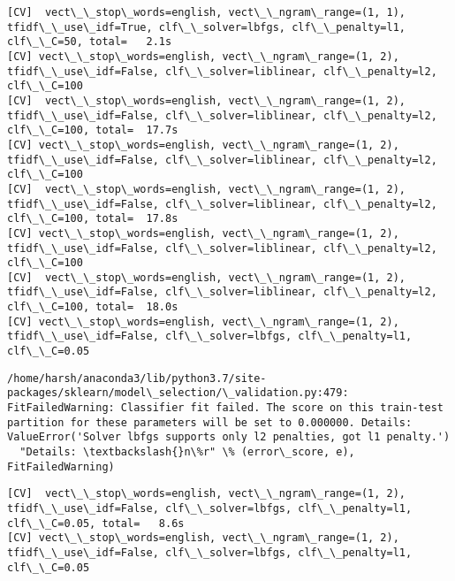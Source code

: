 \documentclass[11pt]{article}
\begin{document}
    \begin{Verbatim}[commandchars=\\\{\}]
[CV]  vect\_\_stop\_words=english, vect\_\_ngram\_range=(1, 1), tfidf\_\_use\_idf=True, clf\_\_solver=lbfgs, clf\_\_penalty=l1, clf\_\_C=50, total=   2.1s
[CV] vect\_\_stop\_words=english, vect\_\_ngram\_range=(1, 2), tfidf\_\_use\_idf=False, clf\_\_solver=liblinear, clf\_\_penalty=l2, clf\_\_C=100 
[CV]  vect\_\_stop\_words=english, vect\_\_ngram\_range=(1, 2), tfidf\_\_use\_idf=False, clf\_\_solver=liblinear, clf\_\_penalty=l2, clf\_\_C=100, total=  17.7s
[CV] vect\_\_stop\_words=english, vect\_\_ngram\_range=(1, 2), tfidf\_\_use\_idf=False, clf\_\_solver=liblinear, clf\_\_penalty=l2, clf\_\_C=100 
[CV]  vect\_\_stop\_words=english, vect\_\_ngram\_range=(1, 2), tfidf\_\_use\_idf=False, clf\_\_solver=liblinear, clf\_\_penalty=l2, clf\_\_C=100, total=  17.8s
[CV] vect\_\_stop\_words=english, vect\_\_ngram\_range=(1, 2), tfidf\_\_use\_idf=False, clf\_\_solver=liblinear, clf\_\_penalty=l2, clf\_\_C=100 
[CV]  vect\_\_stop\_words=english, vect\_\_ngram\_range=(1, 2), tfidf\_\_use\_idf=False, clf\_\_solver=liblinear, clf\_\_penalty=l2, clf\_\_C=100, total=  18.0s
[CV] vect\_\_stop\_words=english, vect\_\_ngram\_range=(1, 2), tfidf\_\_use\_idf=False, clf\_\_solver=lbfgs, clf\_\_penalty=l1, clf\_\_C=0.05 

    \end{Verbatim}

    \begin{Verbatim}[commandchars=\\\{\}]
/home/harsh/anaconda3/lib/python3.7/site-packages/sklearn/model\_selection/\_validation.py:479: FitFailedWarning: Classifier fit failed. The score on this train-test partition for these parameters will be set to 0.000000. Details: 
ValueError('Solver lbfgs supports only l2 penalties, got l1 penalty.')
  "Details: \textbackslash{}n\%r" \% (error\_score, e), FitFailedWarning)

    \end{Verbatim}

    \begin{Verbatim}[commandchars=\\\{\}]
[CV]  vect\_\_stop\_words=english, vect\_\_ngram\_range=(1, 2), tfidf\_\_use\_idf=False, clf\_\_solver=lbfgs, clf\_\_penalty=l1, clf\_\_C=0.05, total=   8.6s
[CV] vect\_\_stop\_words=english, vect\_\_ngram\_range=(1, 2), tfidf\_\_use\_idf=False, clf\_\_solver=lbfgs, clf\_\_penalty=l1, clf\_\_C=0.05 

    \end{Verbatim}
\end{document}
